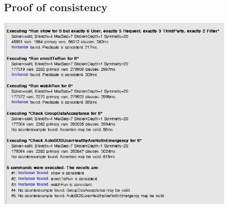 \subsection{Proof of consistency}
{
\centering
\includegraphics[width = 0.9\textwidth]{../Alloy/proofOfConcept.jpg}\\
}
